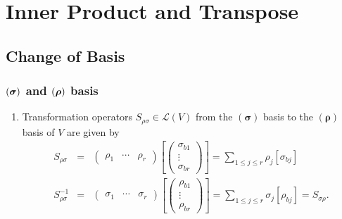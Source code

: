 \documentclass[aps,preprint]{revtex4}
\begin{document}
\section{Inner Product and Transpose}

\subsection{Change of Basis}

\subsubsection{$\left( \boldsymbol{\protect\sigma }\right) $ and $\left( 
\boldsymbol{\protect\rho }\right) $ basis}

\begin{enumerate}
\item Transformation operators $S_{\rho \sigma }\in \mathcal{L}\left(
V\right) $ from the $\left( \boldsymbol{\sigma }\right) $ basis to the $%
\left( \boldsymbol{\rho }\right) $ basis of $V$ are given by 
\begin{eqnarray}
S_{\rho \sigma } &=&\left( 
\begin{array}{ccc}
\rho _{1} & \cdots & \rho _{r}%
\end{array}%
\right) \left[ \left( 
\begin{array}{c}
\sigma _{b1} \\ 
\vdots \\ 
\sigma _{br}%
\end{array}%
\right) \right] =\sum_{1\leq j\leq r}\rho _{j}\left[ \sigma _{bj}\right] \\
S_{\rho \sigma }^{-1} &=&\left( 
\begin{array}{ccc}
\sigma _{1} & \cdots & \sigma _{r}%
\end{array}%
\right) \left[ \left( 
\begin{array}{c}
\rho _{b1} \\ 
\vdots \\ 
\rho _{br}%
\end{array}%
\right) \right] =\sum_{1\leq j\leq r}\sigma _{j}\left[ \rho _{bj}\right]
=S_{\sigma \rho }.
\end{eqnarray}


\end{enumerate}
\end{document}
